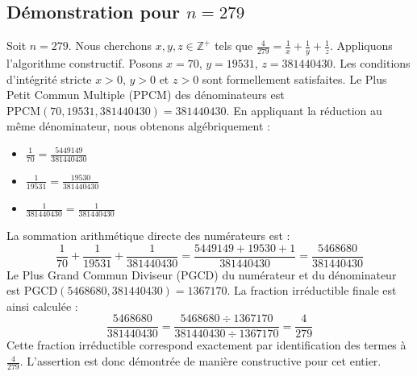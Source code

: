 \documentclass[11pt,a4paper]{article}
\begin{document}
\subsection{Démonstration pour $n = 279$}
Soit $n = 279$. Nous cherchons $x, y, z \in \mathbb{Z}^{+}$ tels que $\frac{4}{279} = \frac{1}{x} + \frac{1}{y} + \frac{1}{z}$.
Appliquons l'algorithme constructif. Posons $x = 70$, $y = 19531$, $z = 381440430$.
Les conditions d'intégrité stricte $x > 0$, $y > 0$ et $z > 0$ sont formellement satisfaites.
Le Plus Petit Commun Multiple (PPCM) des dénominateurs est $\text{PPCM}(70, 19531, 381440430) = 381440430$.
En appliquant la réduction au même dénominateur, nous obtenons algébriquement :
\begin{itemize}
    \item $\frac{1}{70} = \frac{5449149}{381440430}$
    \item $\frac{1}{19531} = \frac{19530}{381440430}$
    \item $\frac{1}{381440430} = \frac{1}{381440430}$
\end{itemize}
La sommation arithmétique directe des numérateurs est :
$$ \frac{1}{70} + \frac{1}{19531} + \frac{1}{381440430} = \frac{5449149 + 19530 + 1}{381440430} = \frac{5468680}{381440430} $$
Le Plus Grand Commun Diviseur (PGCD) du numérateur et du dénominateur est $\text{PGCD}(5468680, 381440430) = 1367170$.
La fraction irréductible finale est ainsi calculée :
$$ \frac{5468680}{381440430} = \frac{5468680 \div 1367170}{381440430 \div 1367170} = \frac{4}{279} $$
Cette fraction irréductible correspond exactement par identification des termes à $\frac{4}{279}$. L'assertion est donc démontrée de manière constructive pour cet entier.
\end{document}
